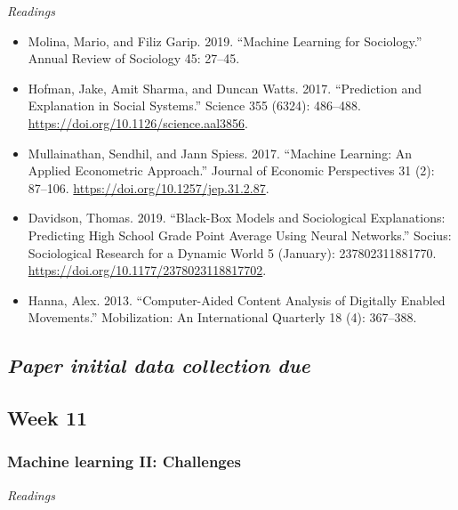 \documentclass[
  10pt,
]{article}
\providecommand{\tightlist}{%
  \setlength{\itemsep}{0pt}\setlength{\parskip}{0pt}}
\begin{document}
\emph{Readings}

\begin{itemize}
\tightlist
\item
  Molina, Mario, and Filiz Garip. 2019. ``Machine Learning for
  Sociology.'' Annual Review of Sociology 45: 27--45.
\item
  Hofman, Jake, Amit Sharma, and Duncan Watts. 2017. ``Prediction and
  Explanation in Social Systems.'' Science 355 (6324): 486--488.
  \url{https://doi.org/10.1126/science.aal3856}.
\item
  Mullainathan, Sendhil, and Jann Spiess. 2017. ``Machine Learning: An
  Applied Econometric Approach.'' Journal of Economic Perspectives 31
  (2): 87--106. \url{https://doi.org/10.1257/jep.31.2.87}.
\item
  Davidson, Thomas. 2019. ``Black-Box Models and Sociological
  Explanations: Predicting High School Grade Point Average Using Neural
  Networks.'' Socius: Sociological Research for a Dynamic World 5
  (January): 237802311881770.
  \url{https://doi.org/10.1177/2378023118817702}.
\item
  Hanna, Alex. 2013. ``Computer-Aided Content Analysis of Digitally
  Enabled Movements.'' Mobilization: An International Quarterly 18 (4):
  367--388.
\end{itemize}

\hypertarget{paper-initial-data-collection-due}{%
\subsection{\texorpdfstring{\emph{Paper initial data collection
due}}{Paper initial data collection due}}\label{paper-initial-data-collection-due}}

\hypertarget{week-11}{%
\subsection{Week 11}\label{week-11}}

\hypertarget{machine-learning-ii-challenges}{%
\subsubsection{Machine learning II:
Challenges}\label{machine-learning-ii-challenges}}

\emph{Readings}
\end{document}
